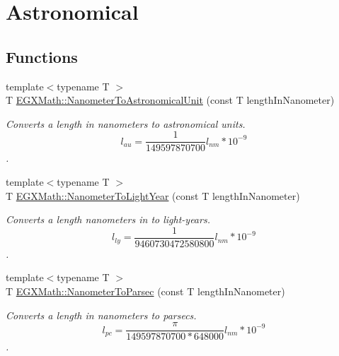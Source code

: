 \hypertarget{group___e_g_x_math-_conversions-_length_conversions-_s_i-_nanometer-_astronomical}{}\section{Astronomical}
\label{group___e_g_x_math-_conversions-_length_conversions-_s_i-_nanometer-_astronomical}
\subsection*{Functions}
\begin{DoxyCompactItemize}
\item 
{\footnotesize template$<$typename T $>$ }\\T \mbox{\hyperlink{group___e_g_x_math-_conversions-_length_conversions-_s_i-_nanometer-_astronomical_gab45f259430dc605beef983b095325ce1}{E\+G\+X\+Math\+::\+Nanometer\+To\+Astronomical\+Unit}} (const T length\+In\+Nanometer)
\begin{DoxyCompactList}\small\item\em Converts a length in nanometers to astronomical units. \[ l_{au}= \frac{1}{149597870700} l_{nm} * 10^{-9} \]. \end{DoxyCompactList}\item 
{\footnotesize template$<$typename T $>$ }\\T \mbox{\hyperlink{group___e_g_x_math-_conversions-_length_conversions-_s_i-_nanometer-_astronomical_ga9ef3d82e1ccb8e07dfb52500ff447b17}{E\+G\+X\+Math\+::\+Nanometer\+To\+Light\+Year}} (const T length\+In\+Nanometer)
\begin{DoxyCompactList}\small\item\em Converts a length nanometers in to light-\/years. \[ l_{ly}= \frac{1}{9460730472580800} l_{nm} * 10^{-9} \]. \end{DoxyCompactList}\item 
{\footnotesize template$<$typename T $>$ }\\T \mbox{\hyperlink{group___e_g_x_math-_conversions-_length_conversions-_s_i-_nanometer-_astronomical_ga20e55ba8ac39aaf9b27c4092266cdcee}{E\+G\+X\+Math\+::\+Nanometer\+To\+Parsec}} (const T length\+In\+Nanometer)
\begin{DoxyCompactList}\small\item\em Converts a length in nanometers to parsecs. \[ l_{pc}=\frac{\pi}{149597870700 * 648000} l_{nm} * 10^{-9} \]. \end{DoxyCompactList}\end{DoxyCompactItemize}


